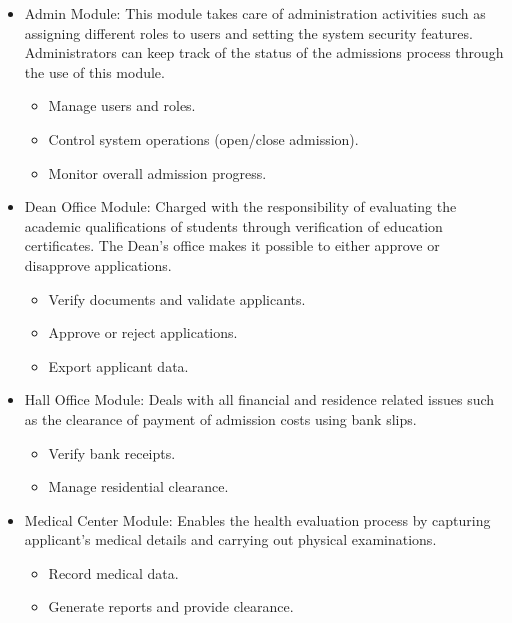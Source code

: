 \begin{itemize}[leftmargin=*, labelsep=0.3cm]
    \item{Admin Module:} 
    This module takes care of administration activities such as assigning different roles to users and setting the system security features. Administrators can keep track of the status of the admissions process through the use of this module.
    \begin{itemize}
        \item Manage users and roles.
        \item Control system operations (open/close admission).
        \item Monitor overall admission progress.
    \end{itemize}
    
    \vspace{0.2cm}
    \item{Dean Office Module:} 
    Charged with the responsibility of evaluating the academic qualifications of students through verification of education certificates. The Dean’s office makes it possible to either approve or disapprove applications.
    \begin{itemize}
        \item Verify documents and validate applicants.
        \item Approve or reject applications.
        \item Export applicant data.
    \end{itemize}
    
    \vspace{0.2cm}
    \item{Hall Office Module:} 
    Deals with all financial and residence related issues such as the clearance of payment of admission costs using bank slips.
    \begin{itemize}
        \item Verify bank receipts.
        \item Manage residential clearance.
    \end{itemize}
    
    \vspace{0.2cm}
    \item{Medical Center Module:} 
    Enables the health evaluation process by capturing applicant’s medical details and carrying out physical examinations.
    \begin{itemize}
        \item Record medical data.
        \item Generate reports and provide clearance.
    \end{itemize}
    

\end{itemize}
